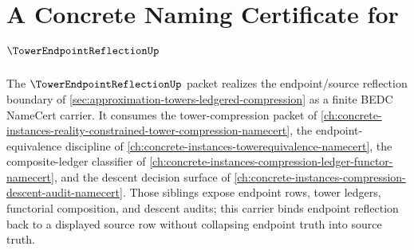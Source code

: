 \chapter{A Concrete Naming Certificate for $\TowerEndpointReflectionUp$}
\label{ch:concrete-instances-towerendpointreflection-namecert}

The $\TowerEndpointReflectionUp$ packet realizes the endpoint/source reflection boundary of \autoref{sec:approximation-towers-ledgered-compression} as a finite BEDC NameCert carrier. It consumes the tower-compression packet of \autoref{ch:concrete-instances-reality-constrained-tower-compression-namecert}, the endpoint-equivalence discipline of \autoref{ch:concrete-instances-towerequivalence-namecert}, the composite-ledger classifier of \autoref{ch:concrete-instances-compression-ledger-functor-namecert}, and the descent decision surface of \autoref{ch:concrete-instances-compression-descent-audit-namecert}. Those siblings expose endpoint rows, tower ledgers, functorial composition, and descent audits; this carrier binds endpoint reflection back to a displayed source row without collapsing endpoint truth into source truth.

